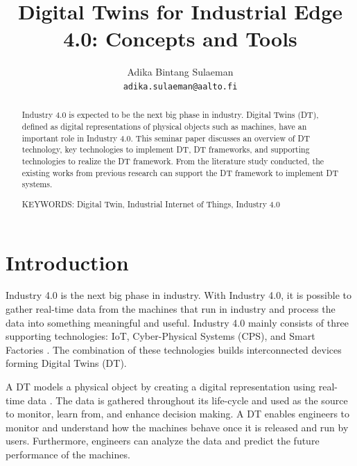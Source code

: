 \documentclass[article,table]{aaltoseries}
\begin{document}
 

\title{Digital Twins for Industrial Edge 4.0: Concepts and Tools}

\author{Adika Bintang Sulaeman%
\\\textnormal{\texttt{adika.sulaeman@aalto.fi}}} %


\maketitle


\begin{abstract}
  Industry 4.0 is expected to be the next big phase in industry. Digital Twins (DT), defined as digital representations of physical objects such as machines, have an important role in Industry 4.0. This seminar paper discusses an overview of DT technology, key technologies to implement DT, DT frameworks, and supporting technologies to realize the DT framework. From the literature study conducted, the existing works from previous research can support the DT framework to implement DT systems.
  
\vspace{3mm}
\noindent KEYWORDS: Digital Twin, Industrial Internet of Things, Industry 4.0

\end{abstract}




\section{Introduction}

Industry 4.0 is the next big phase in industry. With Industry 4.0, it is possible to gather real-time data from the machines that run in industry and process the data into something meaningful and useful. Industry 4.0 mainly consists of three supporting technologies: IoT, Cyber-Physical Systems (CPS), and Smart Factories \cite{hermann2016design}. The combination of these technologies builds interconnected devices forming Digital Twins (DT).

A DT models a physical object by creating a digital representation using real-time data \cite{Cheatshe3:online}. The data is gathered throughout its life-cycle and used as the source to monitor, learn from, and enhance decision making. A DT enables engineers to monitor and understand how the machines behave once it is released and run by users. Furthermore, engineers can analyze the data and predict the future performance of the machines.
\end{document}

